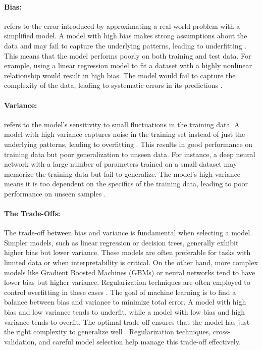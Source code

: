 \paragraph{Bias:}refers to the error introduced by approximating a real-world problem with a simplified model. A model with high bias makes strong assumptions about the data and may fail to capture the underlying patterns, leading to underfitting \cite{friedman2001elements}. This means that the model performs poorly on both training and test data. 
For example, using a linear regression model to fit a dataset with a highly nonlinear relationship would result in high bias. The model would fail to capture the complexity of the data, leading to systematic errors in its predictions \cite{friedman2001elements}.

\paragraph{Variance:}refers to the model's sensitivity to small fluctuations in the training data. A model with high variance captures noise in the training set instead of just the underlying patterns, leading to overfitting \cite{bishop2006pattern}. This results in good performance on training data but poor generalization to unseen data. 
For instance, a deep neural network with a large number of parameters trained on a small dataset may memorize the training data but fail to generalize. The model's high variance means it is too dependent on the specifics of the training data, leading to poor performance on unseen samples \cite{bishop2006pattern}.

\paragraph{The Trade-Offs:} The trade-off between bias and variance is fundamental when selecting a model. Simpler models, such as linear regression or decision trees, generally exhibit higher bias but lower variance. These models are often preferable for tasks with limited data or when interpretability is critical. On the other hand, more complex models like Gradient Boosted Machines (GBMs) or neural networks tend to have lower bias but higher variance. Regularization techniques are often employed to control overfitting in these cases \cite{bishop2006pattern, domingos2012few}.
The goal of machine learning is to find a balance between bias and variance to minimize total error. A model with high bias and low variance tends to underfit, while a model with low bias and high variance tends to overfit. The optimal trade-off ensures that the model has just the right complexity to generalize well \cite{domingos2012few}. Regularization techniques, cross-validation, and careful model selection help manage this trade-off effectively.


